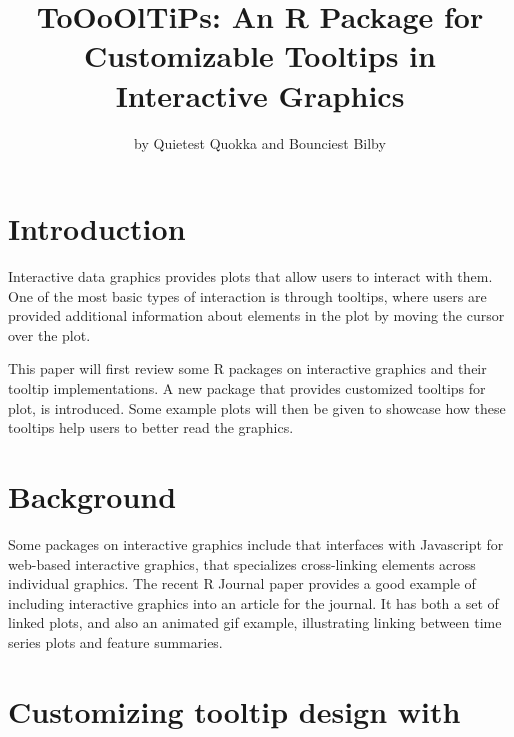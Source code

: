 \title{ToOoOlTiPs: An R Package for Customizable Tooltips in Interactive
Graphics}
\author{by Quietest Quokka and Bounciest Bilby}

\maketitle


\hypertarget{introduction}{%
\section{Introduction}\label{introduction}}

Interactive data graphics provides plots that allow users to interact
with them. One of the most basic types of interaction is through
tooltips, where users are provided additional information about elements
in the plot by moving the cursor over the plot.

This paper will first review some R packages on interactive graphics and
their tooltip implementations. A new package  that
provides customized tooltips for plot, is introduced. Some example plots
will then be given to showcase how these tooltips help users to better
read the graphics.

\hypertarget{background}{%
\section{Background}\label{background}}

Some packages on interactive graphics include 
\citep{plotly} that interfaces with Javascript for web-based interactive
graphics,  \citep{crosstalk} that specializes
cross-linking elements across individual graphics. The recent R Journal
paper  \citep{RJ-2021-050} provides a good example
of including interactive graphics into an article for the journal. It
has both a set of linked plots, and also an animated gif example,
illustrating linking between time series plots and feature summaries.

\hypertarget{customizing-tooltip-design-with}{%
\section{\texorpdfstring{Customizing tooltip design with
}{Customizing tooltip design with }}\label{customizing-tooltip-design-with}}

